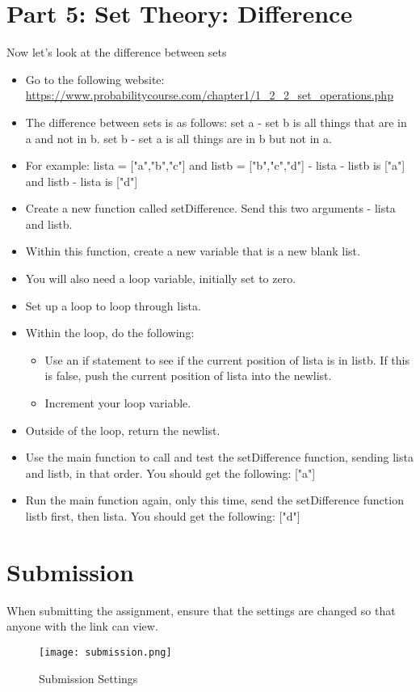 \documentclass{article}
\begin{document}
\section*{Part 5: Set Theory:  Difference}
Now let's look at the difference between sets
\begin{itemize}
	\item Go to the following website:  \url{https://www.probabilitycourse.com/chapter1/1_2_2_set_operations.php}
    \item The difference between sets is as follows:  set a - set b is all things that are in a and not in b.  set b - set a is all things are in b but not in a.
    \item For example:  lista = ["a","b","c"] and listb = ["b","c","d"] - lista - listb is ["a"] and listb - lista is ["d"]
    \item Create a new function called setDifference.  Send this two arguments - lista and listb.
    \item Within this function, create a new variable that is a new blank list.
    \item You will also need a loop variable, initially set to zero.
    \item Set up a loop to loop through lista.
    \item Within the loop, do the following:
    \begin{itemize}
    		\item Use an if statement to see if the current position of lista is in listb.  If this is false, push the current position of lista into the newlist.
    		\item Increment your loop variable.
    	\end{itemize}
    	\item Outside of the loop, return the newlist.
    	\item Use the main function to call and test the setDifference function, sending lista and listb, in that order.  You should get the following:  ["a"]
    	\item Run the main function again, only this time, send the setDifference function listb first, then lista.  You should get the following: ["d"]
\end{itemize}

\section*{Submission}
When submitting the assignment, ensure that the settings are changed so that anyone with the link can view.
\begin{figure}[H]
  \centering
  \texttt{[image: submission.png]}
  \caption{Submission Settings}
\end{figure}
\end{document}

